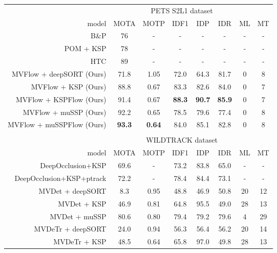 \documentclass[10pt,twocolumn,letterpaper]{article}
\begin{document}
\begin{table*}[h]
    \begin{center}
    \begin{tabular}{r  c c c c c c c } \toprule
        &  \multicolumn{6}{c}{PETS S2L1 dataset}  \\ \cmidrule(lr{.75em}){2-7}
    model & MOTA & MOTP & IDF1 & IDP & IDR & ML & MT   \\ \midrule
    B\&P \cite{Leal-Taixe12} & 76 & - & - & - & - & - & -  \\ POM + KSP \cite{Berclaz11} & 78 & - & - & - & - & - & -  \\ HTC \cite{Xu16} & 89 & -  & - & - & - & - & -  \\ MVFlow + deepSORT (Ours) & 71.8 & 1.05 & 72.0 & 64.3 & 81.7 & 0 & 8 \\
    MVFlow + KSP (Ours) & 88.8 & 0.67 & 83.3 & 82.6 & 84.0 & 0 & 7  \\
    MVFlow + KSPFlow (Ours) & 91.4 & 0.67 & \textbf{88.3} & \textbf{90.7} & \textbf{85.9} & 0 & 7  \\
    MVFlow + muSSP (Ours) & 92.2 & 0.65 & 78.5 & 79.6 & 77.4 & 0 & 8  \\
    MVFlow + muSSPFlow (Ours) & \textbf{93.3} & \textbf{0.64} & 84.0 & 85.1 & 82.8 & 0 & 8  \\
\vspace{-0.5em}
    \rule{0pt}{4ex}  \\
    &  \multicolumn{6}{c}{WILDTRACK dataset}  \\ \cmidrule(lr{.75em}){2-7}
    model & MOTA & MOTP & IDF1 & IDP & IDR & ML & MT   \\ \midrule
    DeepOcclusion+KSP \cite{Chavdarova18a} & 69.6 & - & 73.2 & 83.8 & 65.0 & - & -   \\ DeepOcclusion+KSP+ptrack \cite{Chavdarova18a} & 72.2 & - & 78.4 & 84.4 & 73.1 & - & -  \\ \midrule
    MVDet \cite{hou2020multiview} + deepSORT & 8.3 & 0.95 & 48.8 & 46.9 & 50.8 & 20 & 12 \\
    MVDet \cite{hou2020multiview} + KSP & 46.9 & 0.81 & 64.8 & 95.5 & 49.0 & 28 & 13 \\
    MVDet \cite{hou2020multiview} + muSSP & 80.6 & 0.80 & 79.4 & 79.2 & 79.6 & 4 & 29 \\ 
    \midrule
    MVDeTr \cite{hou2021multiview} + deepSORT & 24.0 & 0.94 & 56.3 & 56.4 & 56.2 & 20 & 14 \\
    MVDeTr \cite{hou2021multiview} + KSP & 48.5 & 0.64 & 65.8 & 97.0 & 49.8 & 28 & 13 \\

\end{tabular}
\end{center}
\end{table*}
\end{document}
